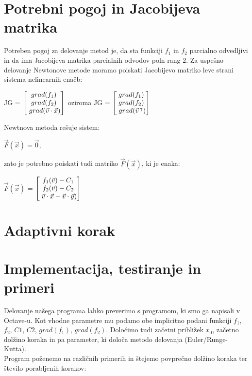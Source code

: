 \documentclass[12pt]{article}
\begin{document}
\newpage	
\section{Potrebni pogoj in Jacobijeva matrika}
	Potreben pogoj za delovanje metod je, da sta funkciji $f_{1}$ in $f_{2}$ parcialno odvedljivi in da ima Jacobijeva matrika parcialnih odvodov poln rang 2. Za uspešno delovanje Newtonove metode moramo poiskati Jacobijevo matriko leve strani sistema nelinearnih enačb:

	\begin{center}
		JG = $\begin{bmatrix}
		grad(f_{1}) \\
		grad(f_{2}) \\
		\hspace{1mm}grad(\vec{v} \cdot \vec{x}) \\
		\end{bmatrix}$
		oziroma
		JG = $\begin{bmatrix}
		grad(f_{1}) \\
		grad(f_{2}) \\
		\hspace{1mm}grad(\vec{v}\hspace{0.5mm}^\intercal) \\
		\end{bmatrix}$
	\end{center}
	Newtnova metoda rešuje sistem:
	\begin{center}
	    $\vec{F}(\vec{x}) = \vec{0}$,
	\end{center}
	zato je potrebno poiskati tudi matriko $\vec{F}(\vec{x})$, ki je enaka:
		\begin{center}
		$\vec{F}(\vec{x})$ = $\begin{bmatrix}
		f_{1}(\vec{v}) - C_{1} \\
		f_{2}(\vec{v}) - C_{2} \\
		\hspace{1mm}\vec{v} \cdot \vec{x} - \vec{v} \cdot \vec{y}) \\
		\end{bmatrix}$
	\end{center}

\section{Adaptivni korak}
		
\section{Implementacija, testiranje in primeri}
	Delovanje našega programa lahko preverimo s programom, ki smo ga napisali v Octave-u. Kot vhodne parametre mu podamo obe implicitno podani funkciji $f_{1}$, $f_{2}$, $C1$, $C2$, $grad(f_{1})$, $grad(f_{2})$. Določimo tudi začetni približek $x_{0}$, začetno dolžino koraka in pa parameter, ki določa metodo delovanja (Euler/Runge-Kutta).\\
	Program poženemo na različnih primerih in štejemo povprečno dolžino koraka ter število porabljenih korakov:\\\\
		
\end{document}
